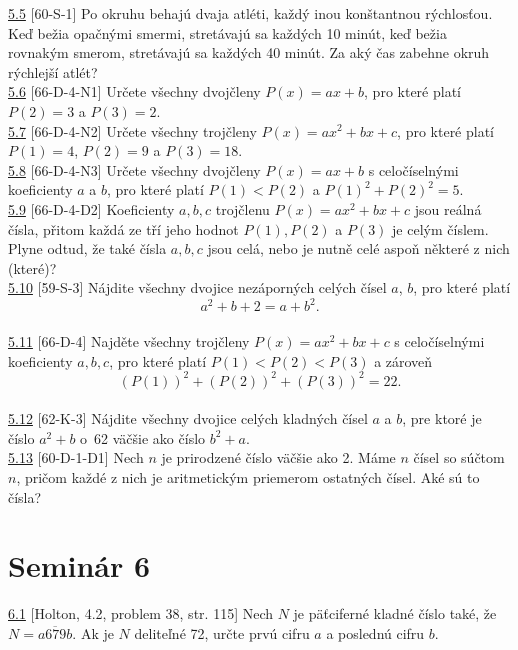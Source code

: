 \noindent \ul{5.5} [60-S-1]
Po okruhu behajú dvaja atléti, každý inou konštantnou rýchlosťou. Keď bežia opačnými smermi, stretávajú sa každých 10 minút, keď bežia rovnakým smerom, stretávajú sa každých 40 minút. Za aký čas zabehne okruh rýchlejší atlét?\\

\noindent \ul{5.6} [66-D-4-N1] Určete všechny dvojčleny $P (x) = ax + b$, pro které platí $P(2) = 3$
a $P (3) = 2$.\\

\noindent \ul{5.7} [66-D-4-N2] Určete všechny trojčleny $P (x) = ax^2+ bx + c$, pro které platí $P
(1) = 4$, $P (2) = 9$ a $P (3) = 18$.\\


\noindent \ul{5.8} [66-D-4-N3] Určete všechny dvojčleny $P (x) = ax+b$ s celočíselnými koeficienty
$a$ a $b$, pro které platí $P (1) < P (2)$ a $P (1)^2+ P(2)^2= 5$.\\

\noindent \ul{5.9} [66-D-4-D2] Koeficienty $a, b, c$ trojčlenu $P (x) = ax^2+ bx + c$ jsou reálná
čísla, přitom každá ze tří jeho hodnot $P (1), P (2)$ a $P (3)$ je celým číslem. Plyne odtud, že
také čísla $a, b, c$ jsou celá, nebo je nutně celé aspoň některé z nich (které)?\\

\noindent \ul{5.10} [59-S-3] Nájdite všechny dvojice nezáporných celých čísel $a$, $b$, pro které platí
$$a^2 + b + 2 = a + b^2.$$\\

\noindent \ul{5.11} [66-D-4]
Najděte všechny trojčleny $P(x)=ax^2+bx+c$ s celočíselnými koeficienty $a, b, c$, pro které platí $P(1) < P(2) < P(3)$ a zároveň $$(P(1))^2+ (P(2))^2+ (P(3))^2= 22.$$\\

\noindent \ul{5.12} [62-K-3]
Nájdite všechny dvojice celých kladných čísel $a$ a $b$, pre ktoré je číslo $a^2 +b$ o~62 väčšie
ako číslo $b^2 + a$.\\

\noindent \ul{5.13} [60-D-1-D1] Nech $n$ je prirodzené číslo väčšie ako 2. Máme $n$ čísel so súčtom $n$, pričom každé z nich je aritmetickým priemerom ostatných čísel. Aké sú to čísla?\\

\section*{Seminár 6}

\noindent \ul{6.1} [Holton, 4.2, problem 38, str. 115] Nech $N$ je päťciferné kladné číslo také, že $N=\overline{a679b}$. Ak je $N$ deliteľné 72, určte prvú cifru $a$ a poslednú cifru $b$.\\

